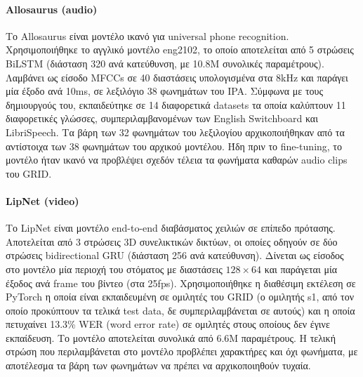\paragraph{Allosaurus (audio) \cite{li2020universal}} Το Allosaurus είναι μοντέλο ικανό για universal phone recognition. Χρησιμοποιήθηκε το αγγλικό μοντέλο eng2102, το οποίο αποτελείται από 5 στρώσεις BiLSTM (διάσταση 320 ανά κατεύθυνση, με 10.8M συνολικές παραμέτρους). Λαμβάνει ως είσοδο MFCCs σε 40 διαστάσεις υπολογισμένα στα 8kHz και παράγει μία έξοδο ανά 10ms, σε λεξιλόγιο 38 φωνημάτων του IPA. Σύμφωνα με τους δημιουργούς του, εκπαιδεύτηκε σε 14 διαφορετικά datasets τα οποία καλύπτουν 11 διαφορετικές γλώσσες, συμπεριλαμβανομένων των English Switchboard και LibriSpeech. Τα βάρη των 32 φωνημάτων του λεξιλογίου αρχικοποιήθηκαν από τα αντίστοιχα των 38 φωνημάτων του αρχικού μοντέλου. Ήδη πριν το fine-tuning, το μοντέλο ήταν ικανό να προβλέψει σχεδόν τέλεια τα φωνήματα καθαρών audio clips του GRID.

\paragraph{LipNet (video) \cite{assael2016lipnetendtoendsentencelevellipreading}} Το LipNet είναι μοντέλο end-to-end διαβάσματος χειλιών σε επίπεδο πρότασης. Αποτελείται από 3 στρώσεις 3D συνελικτικών δικτύων, οι οποίες οδηγούν σε δύο στρώσεις bidirectional GRU (διάσταση 256 ανά κατεύθυνση). Δίνεται ως είσοδος στο μοντέλο μία περιοχή του στόματος με διαστάσεις $128\times64$ και παράγεται μία έξοδος ανά frame του βίντεο (στα 25fps). Χρησιμοποιήθηκε η διαθέσιμη εκτέλεση σε PyTorch η οποία είναι εκπαιδευμένη σε ομιλητές του GRID (ο ομιλητής s1, από τον οποίο προκύπτουν τα τελικά test data, δε συμπεριλαμβάνεται σε αυτούς) και η οποία πετυχαίνει 13.3\% WER (word error rate) σε ομιλητές στους οποίους δεν έγινε εκπαίδευση. Το μοντέλο αποτελείται συνολικά από 6.6M παραμέτρους. Η τελική στρώση που περιλαμβάνεται στο μοντέλο προβλέπει χαρακτήρες και όχι φωνήματα, με αποτέλεσμα τα βάρη των φωνημάτων να πρέπει να αρχικοποιηθούν τυχαία.

